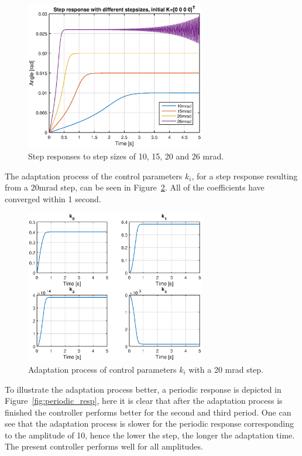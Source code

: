 \begin{figure}[h!]
  \centering
  \includegraphics[width=0.7\textwidth]{fig/matlab/stepresponse.eps}
  \caption{\label{fig:step_adaptive} Step responses to step sizes of 10, 15, 20 and 26 mrad.}
\end{figure}

The adaptation process of the control parameters $k_i$, for a step response resulting from a 20mrad step, can be seen in Figure~\ref{fig:adapt_process}. All of the coefficients have converged within 1 second.

\begin{figure}[h!]
  \centering
  \includegraphics[width=0.7\textwidth]{fig/matlab/k.eps}
  \caption{\label{fig:adapt_process} Adaptation process of control parameters $k_i$ with a 20 mrad step.}
\end{figure}

To illustrate the adaptation process better, a periodic response is depicted in Figure~\ref{fig:periodic_resp}, here it is clear that after the adaptation process is finished the controller performs better for the second and third period. One can see that the adaptation process is slower for the periodic response corresponding to the amplitude of \unit{10}{\milli\radian}, hence the lower the step, the longer the adaptation time. The present controller performs well for all amplitudes.

